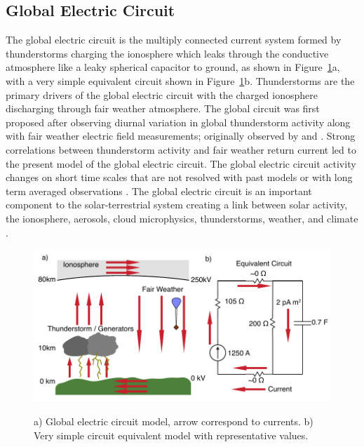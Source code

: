 \subsection{Global Electric Circuit}

The global electric circuit is the multiply connected current system formed by thunderstorms charging the ionosphere which leaks through the conductive atmosphere like a leaky spherical capacitor to ground, as shown in Figure~\ref{intro:fig:gec}a, with a very simple equivalent circuit shown in Figure~\ref{intro:fig:gec}b.
Thunderstorms are the primary drivers of the global electric circuit with the charged ionosphere discharging through fair weather atmosphere.
The global circuit was first proposed after observing diurnal variation in global thunderstorm activity along with fair weather electric field measurements; originally observed by \citet{Wilson1921} and \citet{Whipple1929}.
Strong correlations between thunderstorm activity and fair weather return current led to the present model of the global electric circuit.
The global electric circuit activity changes on short time scales that are not resolved with past models or with long term averaged observations \citep{Holzworth1984a}.
The global electric circuit is an important component to the solar-terrestrial system creating a link between solar activity, the ionosphere, aerosols, cloud microphysics, thunderstorms, weather, and climate \citep{Tinsley2007, Holzworth1986}.

\begin{figure}[ht!]
	\centering
	\includegraphics[scale=1]{Introduction/Figures/global_circuit.pdf}\\
	\caption{a) Global electric circuit model, arrow correspond to currents.
			b) Very simple circuit equivalent model with representative values.}
	\label{intro:fig:gec}
\end{figure}

